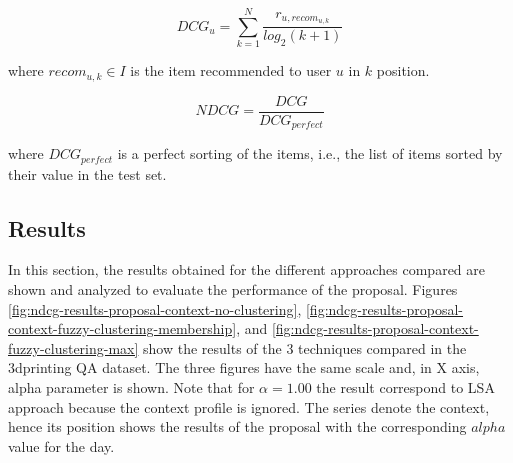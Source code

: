 \documentclass[preprint]{elsarticle}
\begin{document}
\begin{spacing}{1.5}
\begin{equation}
	DCG_u = \sum_{k=1}^N\frac{r_{u,recom_{u,k}}}{log_2 (k+1)}
\end{equation}

\noindent where $recom_{u,k} \in I$ is the item recommended to user $u$ in $k$ position.

\begin{equation}
	NDCG = \frac{DCG}{DCG_{perfect}}
\end{equation}

\noindent where $DCG_{perfect}$ is a perfect sorting of the items, i.e., the list of items sorted by their value in the test set.

\subsection{Results}

In this section, the results obtained for the different approaches compared are shown and analyzed to evaluate the performance of the proposal. Figures \ref{fig:ndcg-results-proposal-context-no-clustering}, \ref{fig:ndcg-results-proposal-context-fuzzy-clustering-membership}, and \ref{fig:ndcg-results-proposal-context-fuzzy-clustering-max} show the results of the 3 techniques compared in the 3dprinting QA dataset. The three figures have the same scale and, in X axis, alpha parameter is shown. Note that for $\alpha=1.00$ the result correspond to LSA approach because the context profile is ignored. The series denote the context, hence its position shows the results of the proposal with the corresponding $alpha$ value for the day.


\end{spacing}
\end{document}
